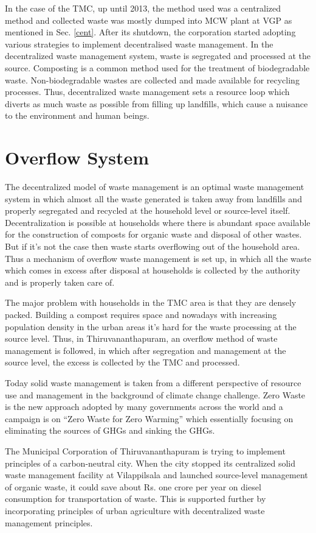 \documentclass[12pt,a4paper]{report}
\begin{document}
In the case of the TMC, up until 2013, the method used was a centralized method and collected waste was mostly dumped into MCW plant at VGP as mentioned in Sec. \ref{cent}. After its shutdown,  the corporation started adopting various strategies to implement decentralised waste management. In the decentralized waste management system, waste is segregated and processed at the source. Composting is a common method used for the treatment of biodegradable waste. Non-biodegradable wastes are collected and made available for recycling processes. Thus, decentralized waste management sets a resource loop which diverts as much waste as possible from filling up landfills, which cause a nuisance to the environment and human beings.

\section{Overflow System}
\label{overflow}
The decentralized model of waste management is an optimal waste management system in which almost all the waste generated is taken away from landfills and properly segregated and recycled at the household level or source-level itself. Decentralization is possible at households where there is abundant space available for the construction of composts for organic waste and disposal of other wastes. But if it's not the case then waste starts overflowing out of the household area. Thus a mechanism of overflow waste management is set up,  in which all the waste which comes in excess after disposal at households is collected by the authority and is properly taken care of.

The major problem with households in the TMC area is that they are densely packed. Building a compost requires space and nowadays with increasing population density in the urban areas it's hard for the waste processing at the source level. Thus, in Thiruvananthapuram, an overflow method of waste management is followed, in which after segregation and management at the source level, the excess is collected by the TMC and processed.

Today solid waste management is taken from a different perspective of resource use and management in the background of climate change challenge. Zero Waste is the new approach adopted by many governments across the world and a campaign is on “Zero Waste for Zero Warming” which essentially focusing on eliminating the sources of GHGs and sinking the GHGs.

The Municipal Corporation of Thiruvananthapuram is trying to implement principles of a carbon-neutral city. When the city stopped its centralized solid waste management facility at Vilappilsala and launched source-level management of organic waste, it could save about Rs. one crore per year on diesel consumption for transportation of waste. This is supported further by incorporating principles of urban agriculture with decentralized waste management principles.
\end{document}
